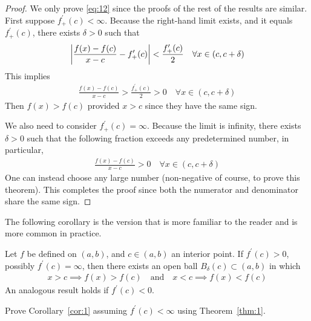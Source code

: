 \documentclass[thmcnt=section, 12pt]{my-elegantbook}
\begin{document}
\begin{proof}
    We only prove \eqref{eq:12} since the proofs of the rest of the results are similar. First suppose $f^\prime_{+}(c) < \infty$. Because the right-hand limit exists, and it equals $f^\prime_{+}(c)$, there exists $\delta > 0$ such that
    \begin{align*}
        \left\lvert 
            \frac{f(x) - f(c)}{x - c}
            - f^\prime_{+}(c)
         \right\rvert < \frac{f^\prime_{+}(c)}{2}
        \quad \forall x \in (c, c+\delta)
    \end{align*}
    This implies
    \begin{align*}
        \frac{f(x) - f(c)}{x - c} > \frac{f^\prime_{+}(c)}{2} > 0
        \quad \forall x \in (c, c+\delta)
    \end{align*}
    Then $f(x) > f(c)$ provided $x > c$ since they have the same sign.
    
    We also need to consider $f^\prime_{+}(c) = \infty$. Because the limit is infinity, there exists $\delta > 0$ such that the following fraction exceeds any predetermined number, in particular,
    \begin{align*}
        \frac{f(x) - f(c)}{x - c} > 0
        \quad \forall x \in (c, c+\delta)
    \end{align*}
    One can instead choose any large number (non-negative of course, to prove this theorem). This completes the proof since both the numerator and denominator share the same sign.
\end{proof}

\par The following corollary is the version that is more familiar to the reader and is more common in practice.

\begin{corollary} \label{cor:1}
    Let $f$ be defined on $(a, b)$, and $c \in (a, b)$ an interior point. If $f^\prime(c) > 0$, possibly $f^\prime(c) = \infty$, then there exists an open ball $B_\delta(c) \subset (a, b)$ in which
    \begin{align}
        x > c \implies f(x) > f(c)
        \quad \text{and} \quad 
        x < c \implies f(x) < f(c)
        \label{eq:14}
    \end{align}
    An analogous result holds if $f^\prime(c) < 0$.
\end{corollary}

\begin{exercise}
    Prove Corollary~\ref{cor:1} assuming $f^\prime(c) < \infty$ using Theorem~\ref{thm:1}.
\end{exercise}
\end{document}

